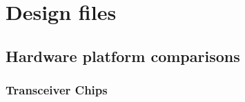 \chapter{Design files}\label{ch:appendix-design}

 \section{Hardware platform comparisons}

 \begin{landscape}
 \subsection{Transceiver Chips}\label{sec:table-transceivers}


\end{landscape}
